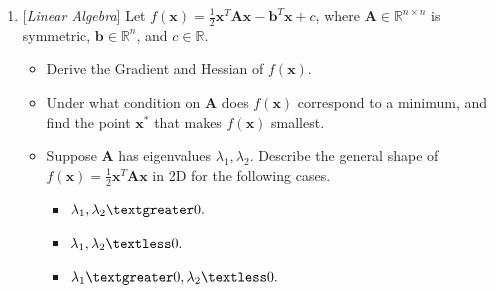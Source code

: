 \documentclass[10pt]{article}
\begin{document}
\begin{enumerate}
\newpage

\item {} {[}\textit{Linear Algebra}{]} 
Let $f(\mathbf{x}) = \frac{1}{2}\mathbf{x}^T\mathbf{A}\mathbf{x} - \boldsymbol{b}^T\mathbf{x} + c$, where $\mathbf{A} \in \mathbb{R}^{n\times n}$ is symmetric, $\boldsymbol{b} \in \mathbb{R}^n$, and $c \in \mathbb{R}$.
\begin{itemize}
	\item[(a)] Derive the Gradient and Hessian of $f(\mathbf{x})$. 
    
	\item[(b)] Under what condition on $\mathbf{A}$ does $f(\mathbf{x})$ correspond to a minimum, and find the point $\mathbf{x}^\ast$ that makes $f(\mathbf{x})$ smallest.  %
    
	\item[(c)] Suppose $\mathbf{A}$ has eigenvalues $\lambda_1, \lambda_2$. Describe the general shape of $f(\mathbf{x})=\frac{1}{2} \mathbf{x}^T\mathbf{A}\mathbf{x}$ in 2D for the following cases. 
    \begin{itemize}
        \item[(1)] $\lambda_1, \lambda_2 \textgreater 0.$ 
        \item[(2)] $\lambda_1, \lambda_2 \textless 0.$ 
        \item[(3)] $\lambda_1\textgreater 0, \lambda_2 \textless 0.$ 
    \end{itemize} %
\end{itemize}


\newpage{}





\end{enumerate}
\end{document}
